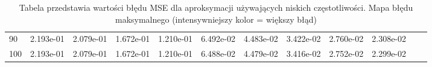 \begin{table}[H]
\begin{tabular}{|l|ccccccccccc||}
90 & \cellcolor{Orange!82}2.193e-01 & \cellcolor{Orange!77}2.079e-01 & \cellcolor{Orange!60}1.672e-01 & \cellcolor{Orange!41}1.210e-01 & \cellcolor{Orange!17}6.492e-02 & \cellcolor{Orange!9}4.483e-02 & \cellcolor{Orange!4}3.422e-02 & \cellcolor{Orange!1}2.760e-02 & \cellcolor{Orange!0}2.308e-02 \\
100 & \cellcolor{Orange!82}2.193e-01 & \cellcolor{Orange!77}2.079e-01 & \cellcolor{Orange!60}1.672e-01 & \cellcolor{Orange!41}1.210e-01 & \cellcolor{Orange!17}6.488e-02 & \cellcolor{Orange!9}4.479e-02 & \cellcolor{Orange!4}3.416e-02 & \cellcolor{Orange!1}2.752e-02 & \cellcolor{Orange!0}2.299e-02 \\
\hline
\end{tabular}
\caption{Tabela przedstawia wartości błędu MSE dla aproksymacji używających niskich częstotliwości. Mapa błędu maksymalnego (intensywniejszy kolor = większy błąd)}
\label{tab:small_values_square}
\end{table}
